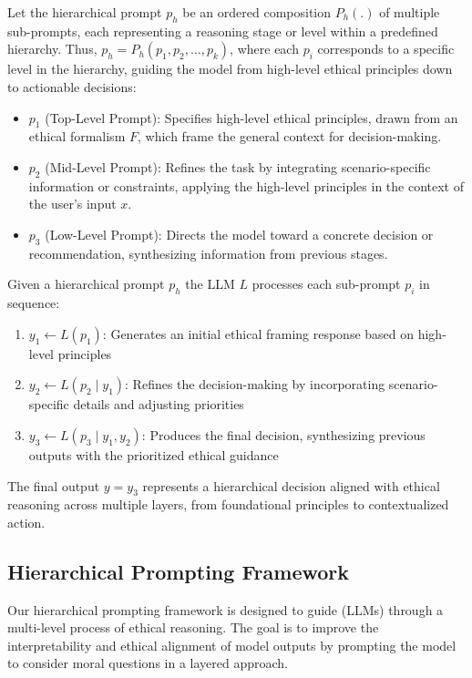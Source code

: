 \documentclass{article}
\begin{document}
Let the hierarchical prompt \( p_h \) be an ordered composition \( P_h(.) \) of multiple sub-prompts, each representing a reasoning stage or level within a predefined hierarchy. Thus, \( p_h = P_h(p_1, p_2, \ldots, p_k) \), where each \( p_i \) corresponds to a specific level in the hierarchy, guiding the model from high-level ethical principles down to actionable decisions:
\begin{itemize}
    \item \textbf{\( p_1 \)} (Top-Level Prompt): Specifies high-level ethical principles, drawn from an ethical formalism \( F \), which frame the general context for decision-making.
    \item \textbf{\( p_2 \)} (Mid-Level Prompt): Refines the task by integrating scenario-specific information or constraints, applying the high-level principles in the context of the user's input \( x \).
    \item \textbf{\( p_3 \)} (Low-Level Prompt): Directs the model toward a concrete decision or recommendation, synthesizing information from previous stages.
\end{itemize}


Given a hierarchical prompt \( p_h \) the LLM \( L \) processes each sub-prompt \( p_i \) in sequence:
\begin{enumerate}
    \item \( y_1 \leftarrow L(p_1) \): Generates an initial ethical framing response based on high-level principles
    \item \( y_2 \leftarrow L(p_2 \mid y_1) \): Refines the decision-making by incorporating scenario-specific details and adjusting priorities
    \item \( y_3 \leftarrow L(p_3 \mid y_1, y_2) \): Produces the final decision, synthesizing previous outputs with the prioritized ethical guidance
\end{enumerate}

The final output \( y = y_3 \) represents a hierarchical decision aligned with ethical reasoning across multiple layers, from foundational principles to contextualized action.


\subsection{Hierarchical Prompting Framework} \label{framework}

Our hierarchical prompting framework is designed to guide (LLMs) through a multi-level process of ethical reasoning. The goal is to improve the interpretability and ethical alignment of model outputs by prompting the model to consider moral questions in a layered approach. 
\end{document}
